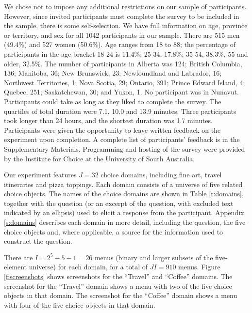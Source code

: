 \documentclass[11pt,letter]{article}
\newcommand{\menus}{menus}
\begin{document}
We chose not to impose any additional restrictions on our sample of participants.
However, since invited participants must complete the survey to be included in the sample, there is some self-selection.
We have full information on age, province or territory, and sex for all 1042 participants in our sample.
There are 515 men (49.4\%) and 527 women (50.6\%).
Age ranges from 18 to 88; the percentage of participants in the age bracket 18-24 is 11.4\%; 25-34, 17.8\%; 35-54, 38.3\%, 55 and older, 32.5\%.
The number of participants in Alberta was 124; British Columbia, 136; Manitoba, 36; New Brunswick, 23; Newfoundland and Labrador, 16; Northwest Territories, 1; Nova Scotia, 29; Ontario, 391; Prince Edward Island, 4; Quebec, 251; Saskatchewan, 30; and Yukon, 1.
No participant was in Nunavut.
Participants could take as long as they liked to complete the survey.
The quartiles of total duration were 7.1, 10.0 and 13.9 minutes.
Three participants took longer than 24 hours, and the shortest duration was 1.7 minutes.
Participants were given the opportunity to leave written feedback on the experiment upon completion.
A complete list of participants' feedback is in the Supplementary Materials.
Programming and hosting of the survey were provided by the Institute for Choice at the University of South Australia.

Our experiment features $J=32$ choice domains, including fine art, travel itineraries and pizza toppings.
Each domain consists of a universe of five related choice objects.
The names of the choice domains are shown in Table \ref{t:domains}, together with the question (or an excerpt of the question, with excluded text indicated by an ellipsis) used to elicit a response from the participant.
Appendix \ref{s:domains} describes each domain in more detail, including the question, the five choice objects and, where applicable, a source for the information used to construct the question.

There are $I=2^{5}-5-1=26$ \menus{} (binary and larger subsets of the five-element universe) for each domain, for a total of $JI=910$ \menus{}.
Figure \ref{f:screenshots} shows screenshots for the ``Travel'' and ``Coffee'' domains.
The screenshot for the ``Travel'' domain shows a menu with two of the five choice objects in that domain.
The screenshot for the ``Coffee'' domain shows a menu with four of the five choice objects in that domain.
\end{document}
